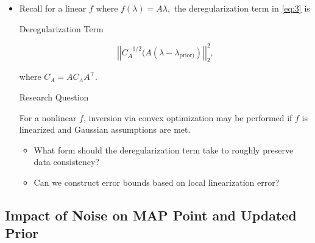 \documentclass[11pt]{beamer}
\begin{document}
\begin{frame}

\begin{itemize}
	
	
	\item  Recall for a linear $f$ where $f(\lambda)=A \lambda,$ the deregularization term in \eqref{eq:3} is

\begin{block}{Deregularization Term}

\begin{equation} \label{eq:10}
\left|\left|C_A^{-1/2}(A(\lambda-\lambda_{\text{prior})})\right|\right|_2^2,
\end{equation} 

\noindent where $C_A=AC_\Lambda A^\top$. 

\end{block}

\begin{block}{Research Question}

For a nonlinear $f$, inversion via convex optimization may be performed if $f$ is linearized and Gaussian assumptions are met. 
\begin{itemize}
\item What form should the deregularization term take to roughly preserve data consistency?
\item  Can we construct error bounds based on local linearization error?
\end{itemize}

\end{block}



\end{itemize}

\end{frame}

\subsection{Impact of Noise on MAP Point and Updated Prior}
\end{document}

